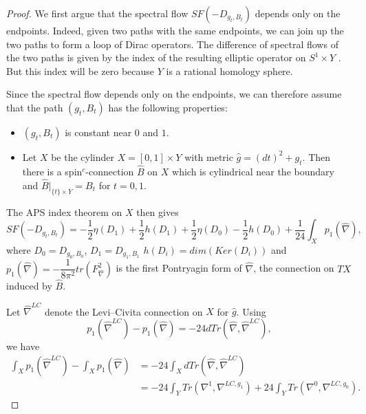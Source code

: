 \documentclass{amsart}
\theoremstyle{definition}
\theoremstyle{remark}
\numberwithin{equation}{section}
\begin{document}
\begin{proof}

We first argue that the spectral flow $SF(-D_{g_t,B_t})$ depends only on the endpoints. Indeed, given two paths with the same endpoints, we can join up the two paths to form a loop of Dirac operators. The difference of spectral flows of the two paths is given by the index of the resulting elliptic operator on $S^1 \times Y$ \cite[Theorem 7.4]{aps3}. But this index will be zero because $Y$ is a rational homology sphere.

Since the spectral flow depends only on the endpoints, we can therefore assume that the path $(g_t,B_t)$ has the following properties:
\begin{itemize}
\item[(1)]{$(g_t,B_t)$ is constant near $0$ and $1$.}
\item[(2)]{Let $X$ be the cylinder $X = [0,1] \times Y$ with metric $\widehat{g} = (dt)^2 + g_t$. Then there is a spin$^c$-connection $\widehat{B}$ on $X$ which is cylindrical near the boundary and $\widehat{B}|_{ \{t \} \times Y} = B_t$ for $t=0,1$.}
\end{itemize}

The APS index theorem on $X$ then gives
\begin{equation}\label{equ:aps1}
SF( -D_{g_t,B_t}) = -\frac{1}{2} \eta(D_1) + \frac{1}{2}h(D_1) + \frac{1}{2}\eta(D_0) - \frac{1}{2} h(D_0) + \frac{1}{24} \int_{X} p_1(\widehat{\nabla}),
\end{equation}
where $D_0 = D_{g_0,B_0}$, $D_1 = D_{g_1,B_1}$ $h(D_i) = dim(Ker(D_i))$ and $p_1(\widehat{\nabla}) = -\dfrac{1}{8\pi^2}tr( F_{\widehat{\nabla}}^2)$ is the first Pontryagin form of $\widehat{\nabla}$, the connection on $TX$ induced by $\widehat{B}$.

Let $\widehat{\nabla}^{LC}$ denote the Levi--Civita connection on $X$ for $\widehat{g}$. Using 
\[
p_1(\widehat{\nabla}^{LC}) - p_1(\widehat{\nabla}) = -24 d Tr( \widehat{\nabla} , \widehat{\nabla}^{LC}),
\] 
we have
\begin{align}\label{equ:aps2}
\int_X p_1(\widehat{\nabla}^{LC}) - \int_X p_1(\widehat{\nabla}) &= -24 \int_X d Tr( \widehat{\nabla} , \widehat{\nabla}^{LC}) \\
& = -24 \int_Y Tr( \nabla^1 , \nabla^{LC , g_1}) + 24 \int_Y Tr(\nabla^0 , \nabla^{LC , g_0}). \nonumber
\end{align}


\end{proof}
\end{document}
